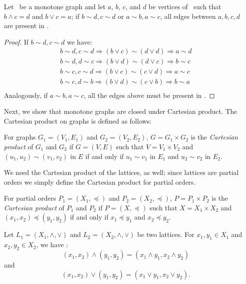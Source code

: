 \begin{lemma}
Let \mG\ be a monotone graph and let
\(a\), \(b\), \(c\), and \(d\) be vertices of \mG\ such that \(b \wedge c = d\) and \(b \vee c = a\);
if \(b\sim d, c\sim d\) or \(a\sim b, a\sim c\), all edges between 
\(a, b, c, d\) are present in \mG\@.
\end{lemma}

\begin{proof}
If \(b\sim d, c\sim d\) we have:
\begin{eqnarray*}
b\sim d, c\sim d \Rightarrow (b \vee c) \sim (d \vee d) \Rightarrow a\sim d\\
b\sim d, d\sim c \Rightarrow (b \vee d) \sim (d \vee c) \Rightarrow b\sim c\\
b\sim c, c\sim d \Rightarrow (b \vee c) \sim (c \vee d) \Rightarrow a\sim c\\
b\sim c, d\sim b \Rightarrow (b \vee d) \sim (c \vee b) \Rightarrow b\sim a\\
\end{eqnarray*}
Analogously, if \(a\sim b, a\sim c\), all the edges above must be present in \mG\@.
\end{proof}

Next, we show that monotone graphs are closed under Cartesian product.
The Cartesian product on graphs is defined as follows:
\begin{defi} 
For graphs \(G_1=(V_1,E_1)\) and \(G_2=(V_2,E_2)\), \(G = G_1 \times G_2\)
is the \emph{Cartesian product} of \(G_1\) and \(G_2\) if \(G=(V,E)\)
such that \(V=V_1 \times V_2\) and \((u_1,u_2)\sim (v_1,v_2)\) in \(E\)
if and only if \(u_1\sim v_1\) in \(E_1\) and \(u_2\sim v_2\) in \(E_2\)\@.
\end{defi}

We need the Cartesian product of the lattices, as well;
since lattices are partial orders we simply define the Cartesian product
for partial orders.
\begin{defi} 
For partial orders \(P_1= (X_1,\preceq)\) and \(P_2=(X_2,\preceq)\), 
\(P= P_1 \times P_2\) is the \emph{Cartesian product} of \(P_1\) and \(P_2\)
if \(P=(X,\preceq)\) such that \(X=X_1\times X_2\) and \((x_1,x_2) \preceq (y_1,y_2)\)
if and only if \(x_1\preceq y_1\) and \(x_2\preceq y_2\)\@.
\end{defi}

\begin{rem}
Let \(L_1=(X_1,\wedge,\vee)\) and \(L_2=(X_2,\wedge,\vee)\) be two lattices.
For \(x_1,y_1 \in X_1\) and \(x_2,y_2\in X_2\), we have :
\[(x_1,x_2)\wedge (y_1,y_2) = (x_1\wedge y_1, x_2 \wedge y_2) \]
and \[(x_1,x_2)\vee (y_1,y_2) = (x_1\vee y_1, x_2 \vee y_2).\]
\end{rem}

